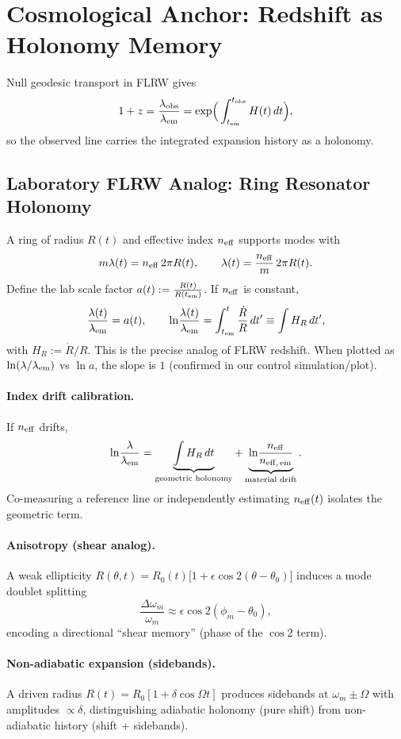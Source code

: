 \documentclass[11pt]{article}
\begin{document}
\section{Cosmological Anchor: Redshift as Holonomy Memory}
Null geodesic transport in FLRW gives
\[
1+z = \frac{\lambda_{\rm obs}}{\lambda_{\rm em}} = \exp\!\Big(\int_{t_{\rm em}}^{t_{\rm obs}} H(t)\,dt\Big),
\]
so the observed line carries the integrated expansion history as a holonomy.

\subsection*{Laboratory FLRW Analog: Ring Resonator Holonomy}
A ring of radius $R(t)$ and effective index $n_{\rm eff}$ supports modes with
\[
m\lambda(t) = n_{\rm eff}\,2\pi R(t),\qquad
\lambda(t) = \frac{n_{\rm eff}}{m}\,2\pi R(t).
\]
Define the lab scale factor $a(t):=\frac{R(t)}{R(t_{\rm em})}$.
If $n_{\rm eff}$ is constant,
\[
\frac{\lambda(t)}{\lambda_{\rm em}} = a(t), \qquad
\ln\!\frac{\lambda(t)}{\lambda_{\rm em}} = \int_{t_{\rm em}}^{t} \frac{\dot R}{R}\,dt' \equiv \int H_R\,dt',
\]
with $H_R:=\dot R/R$. This is the precise analog of FLRW redshift. When plotted as
$\ln(\lambda/\lambda_{\rm em})$ vs $\ln a$, the slope is $1$ (confirmed in our control simulation/plot).

\paragraph{Index drift calibration.}
If $n_{\rm eff}$ drifts,
\[
\ln\!\frac{\lambda}{\lambda_{\rm em}} = \underbrace{\int H_R\,dt}_{\text{geometric holonomy}} + \underbrace{\ln\!\frac{n_{\rm eff}}{n_{{\rm eff},\,{\rm em}}}}_{\text{material drift}}.
\]
Co-measuring a reference line or independently estimating $n_{\rm eff}(t)$ isolates the geometric term.

\paragraph{Anisotropy (shear analog).}
A weak ellipticity $R(\theta,t)=R_0(t)\big[1+\epsilon\cos 2(\theta-\theta_0)\big]$ induces a mode doublet splitting
\[
\frac{\Delta\omega_m}{\omega_m}\approx \epsilon\cos 2(\phi_m-\theta_0),
\]
encoding a directional ``shear memory'' (phase of the $\cos2$ term).

\paragraph{Non-adiabatic expansion (sidebands).}
A driven radius $R(t)=R_0[1+\delta\cos\Omega t]$ produces sidebands at $\omega_m\pm\Omega$ with amplitudes $\propto \delta$,
distinguishing adiabatic holonomy (pure shift) from non-adiabatic history (shift + sidebands).
\end{document}
